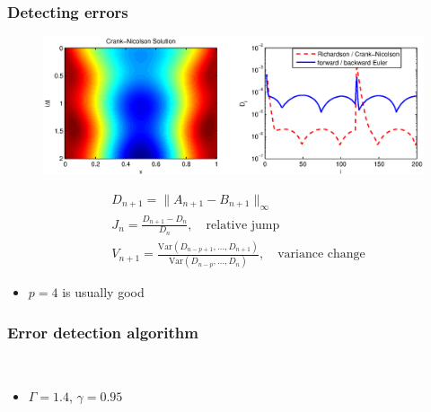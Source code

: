 \documentclass{beamer}
\begin{document}
\begin{frame}
\frametitle{Detecting errors}

\begin{figure}
  \centering
  \includegraphics[scale=0.5]{figs/heat_soln_diffs1.eps}
  \vspace{-1cm}
\end{figure}


\begin{align}
& D_{n+1} = \| A_{n+1} - B_{n+1} \|_{\infty} \nonumber \\
& J_{n} = \frac{D_{n+1} - D_n}{D_n}, \quad \text{relative jump} \nonumber \\
& V_{n+1} = \frac{\text{Var}(D_{n-p+1}, \ldots, D_{n+1})}{\text{Var}(D_{n-p}, \ldots, D_{n})}, \quad \text{variance change} \nonumber
\end{align}

\begin{itemize}
\item $p = 4$ is usually good
\end{itemize}


\end{frame}

\begin{frame}
  \frametitle{Error detection algorithm}
  

  \begin{algorithm}[H]
      \\
  \end{algorithm}
  
  \vspace{0.5cm}
  
  \begin{itemize}
    \item $\Gamma = 1.4$, $\gamma = 0.95$
  \end{itemize}
\end{frame}   
\end{document}
